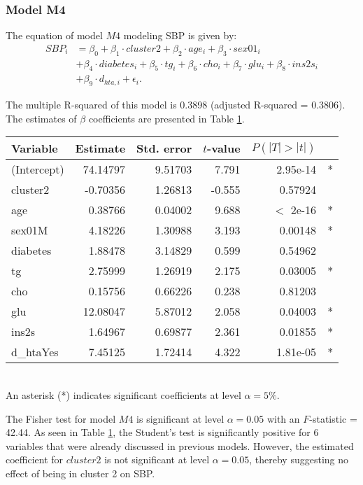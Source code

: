 \subsubsection{Model M4}
The equation of model $M4$ modeling SBP is given by:
\begin{align*}
SBP_i &= \beta_0 + \beta_1 \cdot cluster2 + \beta_2 \cdot age_i + \beta_3 \cdot sex01_i  \\
& +\beta_4 \cdot diabetes_i +\beta_5 \cdot tg_i +\beta_6 \cdot cho_i +\beta_7 \cdot glu_i +\beta_8 \cdot ins2s_i \\
& + \beta_9 \cdot d_{hta,i}+ \epsilon_i.
\end{align*}

The multiple R-squared of this model is 0.3898 (adjusted R-squared = 0.3806). The estimates of $\beta$ coefficients are presented in Table \ref{table:betasm4}.

\begin{table}
\centering
{}
\begin{tabular}{lrrrrl}
\toprule
Variable & Estimate & Std. error & $t$-value & $P(|T|>|t|)$ &\\
\midrule
(Intercept)& 74.14797 &   9.51703&   7.791& 2.95e-14& * \\
cluster2   & -0.70356 &   1.26813  &-0.555 & 0.57924    & \\
age      &    0.38766   & 0.04002  & 9.688 & $<$ 2e-16 & * \\
sex01M   &    4.18226  &  1.30988  & 3.193 & 0.00148& * \\
diabetes    & 1.88478  &  3.14829&   0.599 & 0.54962  & \\  
tg        &   2.75999  &  1.26919   &2.175 & 0.03005 &*  \\
cho    &      0.15756  &  0.66226 &  0.238 & 0.81203  & \\
glu  &       12.08047 &   5.87012 &  2.058 & 0.04003 &*  \\
ins2s     &   1.64967 &   0.69877 &  2.361 & 0.01855& * \\  
d\_htaYes   &  7.45125  &  1.72414   &4.322 &1.81e-05 &* \\
\bottomrule
\end{tabular}
\label{table:betasm4} \\
{\footnotesize An asterisk (*) indicates significant coefficients at level $\alpha=5\%$.}
\end{table}

The Fisher test for model $M4$ is significant at level $\alpha=0.05$ with an $F$-statistic = 42.44. As seen in Table \ref{table:betasm4}, the Student's test is significantly positive for 6 variables that were already discussed in previous models. However, the estimated coefficient for $cluster2$ is not significant at level $\alpha=0.05$, thereby suggesting no effect of being in cluster 2 on SBP.

